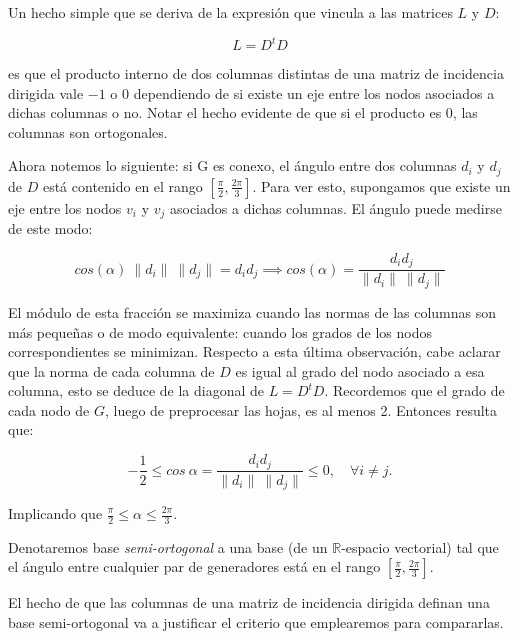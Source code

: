 \documentclass[conference,compsoc,a4paper]{IEEEtran}
\begin{document}
\bigskip


Un hecho simple que se deriva de la expresión que vincula a las matrices 
$L$ y $D$:

$$L = D^t D$$

\noindent es que el producto interno de dos columnas distintas de una matriz de 
incidencia dirigida vale $-1$ o $0$ dependiendo de si existe un eje 
entre los nodos asociados a dichas columnas o no. Notar el hecho 
evidente de que si el producto es $0$, las columnas son
 ortogonales.

\smallskip

Ahora notemos lo siguiente: si G es conexo, el ángulo entre dos 
columnas $d_i$ y $d_j$ de $D$ está contenido en el rango 
$[\frac{\pi}{2},\frac{2\pi}{3}]$. Para ver esto, supongamos que existe 
un eje entre los nodos $v_i$ y $v_j$ asociados a dichas columnas. 
El ángulo puede medirse de este modo:

$$cos(\alpha) \ \|d_i\| \ \|d_j\|= d_i  d_j \implies cos(\alpha) = 
\frac{d_i d_j}{\|d_i\| \ \|d_j\|}$$

El módulo de esta fracción se maximiza cuando las normas de las 
columnas son más pequeñas o de modo equivalente: cuando los grados de 
los nodos correspondientes se minimizan. Respecto a esta última 
observación, cabe aclarar que la norma de cada columna de $D$ es igual 
al grado del nodo asociado a esa columna, esto se deduce de la diagonal 
de $L = D^t D$. Recordemos que el grado de cada nodo de  $G$, luego de 
preprocesar las hojas, es al menos 2. Entonces resulta que:

$$-\frac{1}{2}\le cos \ \alpha = \frac{d_i d_j}{\|d_i\| \ \|d_j\|} \le 0,\quad \forall i\neq j.$$

\smallskip

\noindent Implicando que $\frac{\pi}{2}\le\alpha \leq \frac{2\pi}{3}$.

\smallskip

Denotaremos base \textit{semi-ortogonal} a una base (de un 
$\mathbb{R}$-espacio vectorial) tal que el ángulo entre cualquier par de 
generadores está en el rango $[\frac{\pi}{2},\frac{2\pi}{3}]$.

\smallskip

El hecho de que las columnas de una matriz de incidencia dirigida 
definan una base semi-ortogonal va a justificar el criterio que 
emplearemos para compararlas.

\bigskip

\end{document}
